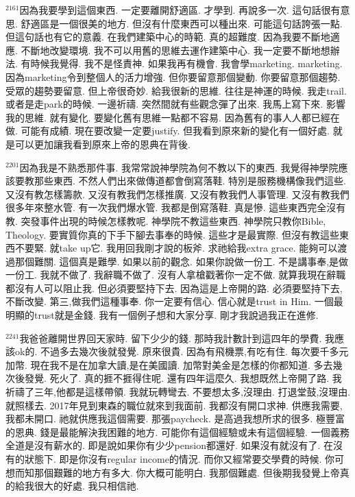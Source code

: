 \documentclass{book}
\begin{document}
$^{2161}$因為我要學到這個東西.
一定要離開舒適區.
才學到.
再說多一次.
這句話很有意思.
舒適區是一個很美的地方.
但沒有什麼東西可以種出來.
可能這句話誇張一點.
但這句話也有它的意義.
在我們建築中心的時範.
真的超難度.
因為我要不斷地適應.
不斷地改變環境.
我不可以用舊的思維去運作建築中心.
我一定要不斷地想辦法.
有時候我覺得.
我不是怪責神.
如果我再有機會.
我會學marketing.
marketing.
因為marketing令到整個人的活力增強.
但你要留意那個變動.
你要留意那個趨勢.
受眾的趨勢要留意.
但上帝很奇妙.
給我很新的思維.
往往是神運的時候.
我走trail.
或者是走park的時候.
一邊祈禱.
突然間就有些觀念彈了出來.
我馬上寫下來.
影響我的思維.
就有變化.
要變化舊有思維一點都不容易.
因為舊有的事人人都已經在做.
可能有成績.
現在要改變一定要justify.
但我看到原來新的變化有一個好處.
就是可以更加讓我看到原來上帝的恩典在背後.

$^{2201}$因為我是不熟悉那件事.
我常常說神學院為何不教以下的東西.
我覺得神學院應該要教那些東西.
不然人們出來做傳道都會倒寫落鞋.
特別是服務機構像我們這些.
又沒有教怎樣籌款.
又沒有教我們怎樣推廣.
又沒有教我們人事管理.
又沒有教我們很多年來整水管.
有一次我們爆水管.
我都是倒寫落鞋.
真是慘.
這些東西完全沒有教.
突發事件出現的時候怎樣教呢.
神學院不教這些東西.
神學院只教你Bible, Theology.
要實質你真的下手下腳去事奉的時候.
這些才是最實際.
但沒有教這些東西不要緊.
就take up它.
我用回我剛才說的板斧.
求祂給我extra grace.
能夠可以渡過那個難關.
這個真是難學.
如果以前的觀念.
如果你說做一份工.
不是講事奉,是做一份工.
我就不做了.
我辭職不做了.
沒有人拿槍戳著你一定不做.
就算我現在辭職都沒有人可以阻止我.
但必須要堅持下去.
因為這是上帝開的路.
必須要堅持下去,不斷改變.
第三,做我們這種事奉.
你一定要有信心.
信心就是trust in Him.
一個最明顯的trust就是金錢.
我有一個例子想和大家分享.
剛才我說過我正在進修.

$^{2241}$我爸爸離開世界回天家時.
留下少少的錢.
那時我計數計到這四年的學費.
我應該ok的.
不過多去幾次後就發覺.
原來很貴.
因為有飛機票,有吃有住.
每次要千多元加幣.
現在我不是在加拿大讀,是在美國讀.
加幣對美金是怎樣的你都知道.
多去幾次後發覺.
死火了.
真的捱不捱得住呢.
還有四年這麼久.
我想既然上帝開了路.
我祈禱了三年,他都是這樣帶領.
我就玩轉彎去.
不要想太多,沒理由.
打退堂鼓,沒理由.
就照樣去.
2017年見到東森的職位就來到我面前.
我都沒有開口求神.
供應我需要,我都未開口.
祂就供應我這個需要.
那張paycheck.
是高過我想所求的很多.
極豐富的恩典.
錢是最能解決我困難的地方.
可能你有這個經驗或未有這個經驗.
一個義務全道是沒有薪水的.
即是說如果你有少少pension都還好.
如果沒有就沒有了.
在沒有的狀態下.
即是你沒有regular income的情況.
而你又經常要交學費的時候.
你可想而知那個艱難的地方有多大.
你大概可能明白.
我那個難處.
但後期我發覺上帝真的給我很大的好處.
我只相信祂.
\end{document}
